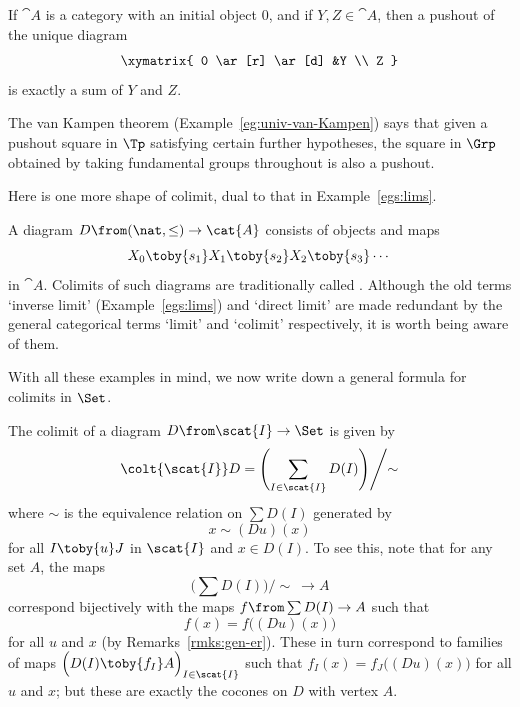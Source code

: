 \begin{example}
If $\cat{A}$ is a category with an initial object $0$, and if $Y, Z \in
\cat{A}$, then a pushout of the unique diagram
\[
\xymatrix{
0 \ar[r] \ar[d] &Y      \\
Z
}
%
\index{sum!pushout@as pushout}
%
\]
is exactly a sum of $Y$ and $Z$.
\end{example}

\begin{example}
The van Kampen%
%
%
theorem (Example~\ref{eg:univ-van-Kampen}) says that given a pushout square
in $\Tp$ satisfying certain further hypotheses, the square in $\Grp$
obtained by taking fundamental%
%
%
groups throughout is also a pushout.
\end{example}

Here is one more shape of colimit, dual to that in
Example~\ref{egs:lims}.

\begin{example}
A diagram $D\from (\nat, \mathord{\leq}) \to \cat{A}$ consists of objects
and maps
\[
X_0 \toby{s_1} X_1 \toby{s_2} X_2 \toby{s_3} \cdots
\]
in $\cat{A}$.  Colimits of such diagrams are traditionally called
.  Although the old terms `inverse limit'
(Example~\ref{egs:lims}) and `direct limit' are made
redundant by the general categorical terms `limit' and `colimit'
respectively, it is worth being aware of them.
\end{example}

With all these examples in mind, we now write down a general formula for
colimits in $\Set$.

\begin{example}
The colimit%
%
%
of a diagram $D\from \scat{I} \to \Set$ is given by
\[
\colt{\scat{I}} D 
= 
\Biggl(
\sum_{I \in \scat{I}} D(I)
\Biggr)
\Bigg/\text{$\sim$}
\]
where $\sim$ is the equivalence relation on $\sum D(I)$ generated by
\[
x \sim (Du)(x)
\]
for all $I \toby{u} J$ in $\scat{I}$ and $x \in D(I)$.  To see this, note
that for any set $A$, the maps
\[
\biggl(\sum D(I)\biggr) \bigg/\text{$\sim$} \: \to A
\]
correspond bijectively with the maps $f\from \sum D(I) \to A$ such that
\[
f(x) = f\bigl((Du)(x)\bigr)
\]
for all $u$ and $x$ (by Remarks~\ref{rmks:gen-er}).  These in turn
correspond to families of maps $\Bigl(D(I) \toby{f_I} A\Bigr)_{I \in
  \scat{I}}$ such that $f_I(x) = f_J\bigl((Du)(x)\bigr)$ for all $u$ and
$x$; but these are exactly the cocones on $D$ with vertex $A$.
\end{example}

